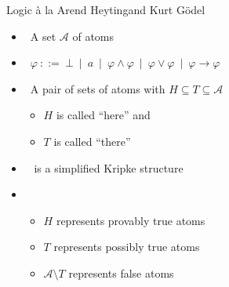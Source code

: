 \begin{frame}{Logic \`a la Arend Heyting}{and Kurt G\"odel}
  \smallskip
  \begin{itemize}
  \item {} \ A set $\mathcal{A}$ of atoms
  \item {} \
    \(
    \varphi \ ::= \ \bot \ \mid \ a \ \mid \ \varphi \land \varphi \ \mid \  \varphi \lor \varphi \ \mid \  \varphi \rightarrow \varphi
    \)
    \smallskip
  \item<2->  \ A pair  of sets of atoms with $H \subseteq T \subseteq\mathcal{A}$
    \begin{itemize}
    \item $H$ is called ``here'' and
    \item $T$ is called ``there''
    \end{itemize}
  \item<2->[]  \  is a simplified Kripke structure
    \smallskip
  \item<3->  \
    \begin{itemize}
    \item $H$ represents provably true atoms
    \item $T$ represents possibly true atoms
    \item $\mathcal{A}\setminus T$ represents false atoms
    \end{itemize}
  \end{itemize}
\end{frame}
